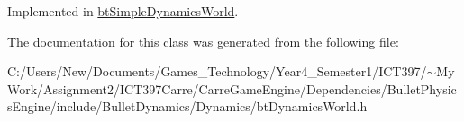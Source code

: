 Implemented in \hyperlink{classbt_simple_dynamics_world_f6b4810b5018cbaf09f82839111a243d}{btSimpleDynamicsWorld}.

The documentation for this class was generated from the following file:\begin{CompactItemize}
\item 
C:/Users/New/Documents/Games\_\-Technology/Year4\_\-Semester1/ICT397/$\sim$My Work/Assignment2/ICT397Carre/CarreGameEngine/Dependencies/BulletPhysicsEngine/include/BulletDynamics/Dynamics/btDynamicsWorld.h\end{CompactItemize}

